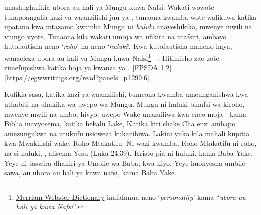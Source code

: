


 unashughulikia ubora au hali ya Mungu kuwa Nafsi. Wakati wowote tunapoangalia kazi ya waanzilishi juu ya , tunaona kwamba wote walikuwa katika upatano kwa mtazamo kwamba Mungu ni \textit{huluki} anayeshikika, mwenye mwili na viungo vyote. Tunaona kila wakati umoja wa ufikira na utafsiri, ambayo hutofautisha neno ‘\textit{roho}’ na neno ‘\textit{huluki}’. Kwa kutofautisha maneno haya, wanaeleza ubora au hali ya Mungu kuwa Nafsi\footnote{\href{https://www.merriam-webster.com/dictionary/personality}{Merriam-Webster Dictionary} inafafanua neno ‘\textit{personality}’ kama “\textit{ubora au hali ya kuwa Nafsi}”.}—. Hitimisho zao zote zimefupishwa katika hoja ya kwanza ya . [FPSDA 1.2][https://egwwritings.org/read?panels=p1299.6]


Kufikia sasa, katika kazi ya waanzilishi, tumeona kwamba  umeunganishwa kwa uthabiti na uhakika wa uwepo wa Mungu. Mungu ni huluki binafsi wa kiroho, mwenye mwili na umbo; hivyo, uwepo Wake unazuiliwa kwa eneo moja—kama Biblia inavyosema, katika hekalu Lake, Katika kiti chake Cha enzi ambapo amezungukwa na utukufu usioweza kukaribiwa. Lakini yuko kila mahali kupitia kwa Mwakilishi wake, Roho Mtakatifu. Ni wazi kwamba, Roho Mtakatifu ni roho, na si huluki, , alisema Yesu (Luka 24:39). Kristo pia ni huluki, kama Baba Yake. Yeye ni taswira dhahiri ya Umbile wa Baba; kwa hiyo, Yeye huonyesha umbile sawa, au ubora au hali ya kuwa nafsi, kama Baba Yake.


